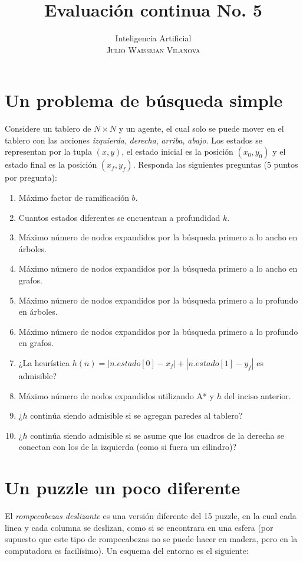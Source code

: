 \documentclass[onecolumn, letter, 12pt]{article}
\title{Evaluación continua No. 5}
\author{Inteligencia Artificial\\ \textsc{Julio Waissman Vilanova}}
\date{}
\begin{document}
\maketitle

\section*{Un problema de búsqueda simple}

Considere un tablero de $N\times N$ y un agente, el cual solo se puede mover en el tablero
con las acciones \emph{izquierda}, \emph{derecha}, \emph{arriba}, \emph{abajo}. Los
estados se representan por la tupla $(x,y)$, el estado inicial es la posición $(x_0,y_0)$
y el estado final es la posición $(x_f,y_f)$.  Responda las siguientes preguntas (5 puntos
por pregunta):

\begin{enumerate}
\item Máximo factor de ramificación $b$.
\item Cuantos estados diferentes se encuentran a profundidad $k$.
\item Máximo número de nodos expandidos por la búsqueda primero a lo ancho en árboles.
\item Máximo número de nodos expandidos por la búsqueda primero a lo ancho en grafos.
\item Máximo número de nodos expandidos por la búsqueda primero a lo profundo en árboles.
\item Máximo número de nodos expandidos por la búsqueda primero a lo profundo en grafos.
\item ¿La heurística $h(n) = |n.estado[0] - x_f| + |n.estado[1] - y_f|$ es admisible?
\item Máximo número de nodos expandidos utilizando A* y $h$ del inciso anterior.
\item ¿$h$ continúa siendo admisible si se agregan paredes al tablero?
\item ¿$h$ continúa siendo admisible si se asume que los cuadros de la derecha se conectan con los de la izquierda (como si fuera un cilindro)?
\end{enumerate}

\newpage

\section*{Un puzzle un poco diferente}

El \emph{rompecabezas deslizante} es una versión diferente del 15 puzzle, en la cual cada linea y cada columna se deslizan, como si se encontrara en una esfera (por supuesto que este tipo de rompecabezas no se puede hacer en madera, pero en la computadora es facilísimo). Un esquema del entorno es el siguiente:
\end{document}
